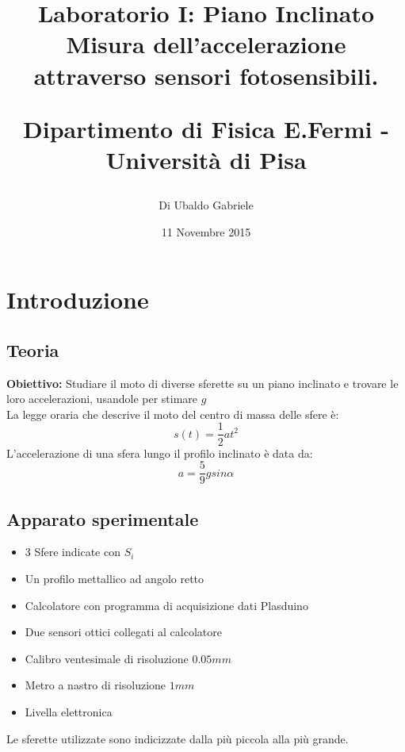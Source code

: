 \documentclass[a4paper,10pt]{article}
\title{Laboratorio I: Piano Inclinato\\ Misura dell'accelerazione attraverso sensori fotosensibili.\\
\begin{large}
Dipartimento di Fisica E.Fermi - Università di Pisa
\end{large}}
\author{Di Ubaldo Gabriele}
\date{11 Novembre 2015}
\begin{document}
\maketitle



\section{Introduzione}
\subsection{Teoria}
\textbf{Obiettivo:} Studiare il moto di diverse sferette su un piano inclinato e trovare le loro accelerazioni, usandole per stimare $g$ \\
La legge oraria che descrive il moto del centro di massa delle sfere è:
\begin{equation}
 s(t)=\frac{1}{2}at^2
\end{equation}
L'accelerazione di una sfera lungo il profilo inclinato è data da:
\begin{equation}
 a=\frac{5}{9}gsin\alpha
\end{equation}
\pagebreak

\subsection{Apparato sperimentale}
\begin{itemize}
\item{3 Sfere indicate con $S_i$}
\item{Un profilo mettallico ad angolo retto}
\item{Calcolatore con programma di acquisizione dati Plasduino}
\item{Due sensori ottici collegati al calcolatore}
\item{Calibro ventesimale di risoluzione $0.05mm$}
\item{Metro a nastro di risoluzione $1mm$}
\item{Livella elettronica}
\end{itemize}
Le sferette utilizzate sono indicizzate dalla più piccola alla più grande.

\end{document}
